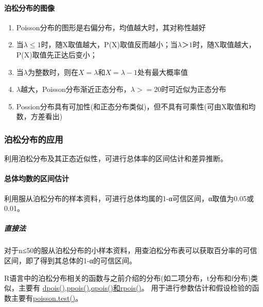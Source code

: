 \documentclass[
]{article}
\providecommand{\tightlist}{%
  \setlength{\itemsep}{0pt}\setlength{\parskip}{0pt}}
\begin{document}
\hypertarget{ux6ccaux677eux5206ux5e03ux7684ux56feux50cf}{%
\paragraph{泊松分布的图像}\label{ux6ccaux677eux5206ux5e03ux7684ux56feux50cf}}

\begin{enumerate}
\def\labelenumi{\arabic{enumi}.}
\tightlist
\item
  Poisson分布的图形是右偏分布，均值越大时，其对称性越好
\item
  当\(\lambda≤1\)时，随X取值越大，P(X)取值反而越小；当\(\lambda＞1\)时，随X取值越大，P(X)取值先正达后变小；
\item
  当\(\lambda\)为整数时，则在\(X=\lambda\)和\(X=\lambda-1\)处有最大概率值
\item
  \(\lambda\)越大，Poisson分布渐近正态分布，\(\lambda>=20\)时可近似为正态分布
\item
  Possion分布具有可加性(和正态分布类似)，但不具有可乘性(可由X取值和均数，方差看出)
\end{enumerate}

\hypertarget{ux6ccaux677eux5206ux5e03ux7684ux5e94ux7528}{%
\subsubsection{泊松分布的应用}\label{ux6ccaux677eux5206ux5e03ux7684ux5e94ux7528}}

利用泊松分布及其正态近似性，可进行总体率的区间估计和差异推断。

\hypertarget{ux603bux4f53ux5747ux6570ux7684ux533aux95f4ux4f30ux8ba1}{%
\paragraph{总体均数的区间估计}\label{ux603bux4f53ux5747ux6570ux7684ux533aux95f4ux4f30ux8ba1}}

利用服从泊松分布的样本资料，可进行总体均属的1-α可信区间，α取值为0.05或0.01。

\hypertarget{ux76f4ux63a5ux6cd5-1}{%
\subparagraph{直接法}\label{ux76f4ux63a5ux6cd5-1}}

对于n≤50的服从泊松分布的小样本资料，用查泊松分布表可以获取百分率的可信区间，即了得到其总体的1-α的可信区间。

R语言中的泊松分布相关的函数与之前介绍的分布(如二项分布，t分布和f分布)类似，主要有
\href{https://www.rdocumentation.org/packages/stats/versions/3.3/topics/Poisson}{dpois(),ppois(),qpois()和rpois()}。
用于进行参数估计和假设检验的函数主要有\href{https://www.rdocumentation.org/packages/stats/versions/3.3/topics/poisson.test}{poisson.test()}。
\end{document}
